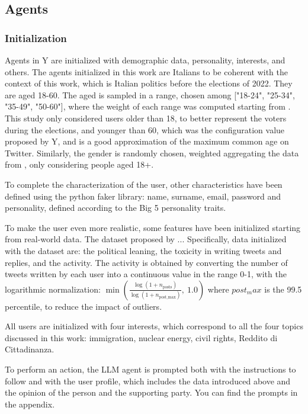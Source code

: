 \subsection{Agents}
\subsubsection{Initialization}
Agents in Y are initialized with demographic data, personality, interests, and others.
The agents initialized in this work are Italians to be coherent with the context of this work, which is Italian politics before the elections of 2022.
They are aged 18-60. The aged is sampled in a range, chosen among ["18-24", "25-34", "35-49", "50-60"], where the weight of each range was computed starting from \cite{statista2024twitter}. This study only considered users older than 18, to better represent the voters during the elections, and younger than 60, which was the configuration value proposed by Y, and is a good approximation of the maximum common age on Twitter.
Similarly, the gender is randomly chosen, weighted aggregating the data from \cite{statista2024twitter}, only considering people aged 18+.

To complete the characterization of the user, other characteristics have been defined using the python faker library: name, surname, email, password and personality, defined according to the Big 5 personality traits.

To make the user even more realistic, some features have been initialized starting from real-world data. The dataset proposed by \citet{pierri2023ita} ... %
Specifically, data initialized with the dataset are: the political leaning, the toxicity in writing tweets and replies, and the activity.
The activity is obtained by converting the number of tweets written by each user into a continuous value in the range 0-1, with the logarithmic normalization:
$\min\left( \frac{\log(1 + n_{\text{posts}})}{\log(1 + n_{\text{post\_max}})},\ 1.0 \right)
$
where $post_max$ is the 99.5 percentile, to reduce the impact of outliers.

All users are initialized with four interests, which correspond to all the four topics discussed in this work: immigration, nuclear energy, civil rights, Reddito di Cittadinanza.

To perform an action, the LLM agent is prompted both with the instructions to follow and with the user profile, which includes the data introduced above and the opinion of the person and the supporting party.
You can find the prompts in the appendix.



